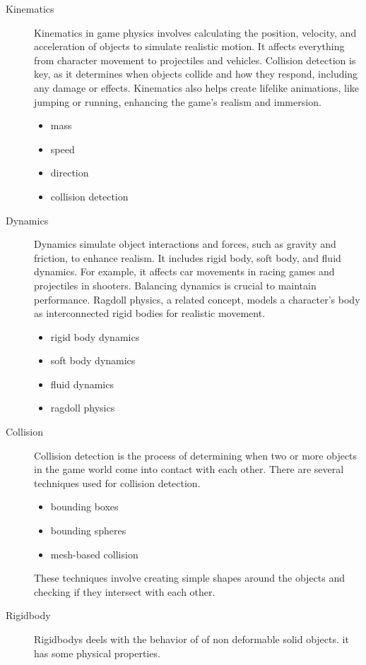\documentclass{projdoc}
\begin{document}
\begin{description}
	\item[Kinematics] Kinematics in game physics involves calculating the position,
		velocity, and acceleration of objects to simulate realistic motion. It affects
		everything from character movement to projectiles and vehicles. Collision
		detection is key, as it determines when objects collide and how they respond,
		including any damage or effects. Kinematics also helps create lifelike
		animations, like jumping or running, enhancing the game's realism and immersion.
		\begin{itemize}
			\item mass
			\item speed
			\item direction
			\item collision detection
		\end{itemize}
	\item[Dynamics] Dynamics simulate object interactions and forces, such as gravity
		and friction, to enhance realism. It includes rigid body, soft body, and fluid
		dynamics. For example, it affects car movements in racing games and projectiles
		in shooters. Balancing dynamics is crucial to maintain performance. Ragdoll
		physics, a related concept, models a character's body as interconnected rigid
		bodies for realistic movement.
		\begin{itemize}
			\item rigid body dynamics
			\item soft body dynamics
			\item fluid dynamics
			\item ragdoll physics
		\end{itemize}
	\item[Collision] Collision detection is the process of determining when two or more
		objects in the game world come into contact with each other. There are several
		techniques used for collision detection.
		\begin{itemize}
			\item bounding boxes
			\item bounding spheres
			\item mesh-based collision
		\end{itemize}
		These techniques involve creating simple shapes around the objects and checking
		if they intersect with each other.
	\item[Rigidbody] Rigidbodys deels with the behavior of of non deformable solid
		objects. it has some physical properties.

\end{description}
\end{document}
